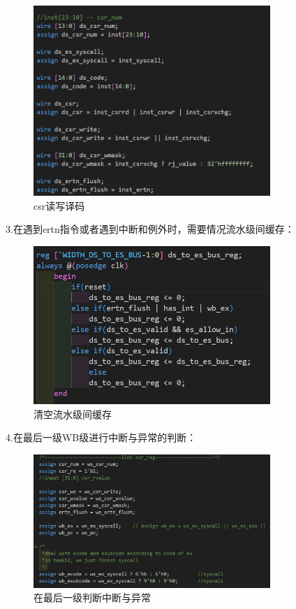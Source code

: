 \documentclass[12pt,a4paper]{article}
\begin{document}
            \begin{figure}[H]
                \centering
                \includegraphics[width=0.8\textwidth,height=0.3\textheight]{csr读写译码.png}
                \caption{csr读写译码}
            \end{figure}
            \par
            3.在遇到ertn指令或者遇到中断和例外时，需要情况流水级间缓存：
            \begin{figure}[H]
                \centering
                \includegraphics[width=0.8\textwidth]{清空流水级缓存.png}
                \caption{清空流水级间缓存}
            \end{figure}
            \par
            4.在最后一级WB级进行中断与异常的判断：
            \begin{figure}[H]
                \centering
                \includegraphics[width=0.8\textwidth]{在最后一级判断中断与异常.png}
                \caption{在最后一级判断中断与异常}
            \end{figure}
                
\end{document}
